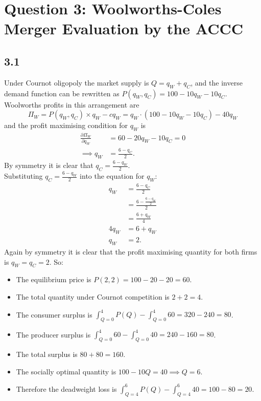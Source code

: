 \documentclass{article}
\begin{document}
\section*{Question 3: Woolworths-Coles Merger Evaluation by the ACCC}
\subsection*{3.1}
Under Cournot oligopoly the market supply is $Q = q_{W} + q_{C}$, and the inverse demand function can be rewritten as $P(q_{W}, q_{C}) = 100 - 10q_{W} - 10q_{C}$. Woolworths profits in this arrangement are 
$$\Pi_{W} = P(q_{W}, q_{C}) \times q_{W} - c q_{W} = q_{W} \cdot (100 - 10q_{W} - 10q_{C}) - 40 q_{W}$$
and the profit maximising condition for $q_{W}$ is
\begin{align*}
    \frac{\partial \Pi_{W}}{\partial q_{W}} &= 60 - 20 q_{W} - 10 q_{C} = 0\\
    \implies q_{W} &= \frac{6 - q_{C}}{2}.
\end{align*}
By symmetry it is clear that $q_{C} = \frac{6 - q_{W}}{2}$.\\[2mm]
Substituting $q_{C} = \frac{6 - q_{W}}{2}$ into the equation for $q_{W}$:
\begin{align*}
    q_{W} &= \frac{6 - q_{C}}{2}\\
    &= \frac{6 - \frac{6 - q_{W}}{2}}{2}\\
    &= \frac{6 + q_{W}}{4}\\
    4 q_{W} &= 6 + q_{W}\\
    q_{W} &= 2.
\end{align*}
Again by symmetry it is clear that the profit maximising quantity for both firms is $q_{W} = q_{C} = 2$. So:
\begin{itemize}
    \item The equilibrium price is $P(2, 2) = 100 - 20 - 20 = 60$.
    \item The total quantity under Cournot competition is $2 + 2 = 4$.
    \item The consumer surplus is $\int_{Q=0}^{4} P(Q) - \int_{Q=0}^{4} 60 = 320 - 240 = 80$.
    \item The producer surplus is $\int_{Q=0}^{4} 60 - \int_{Q=0}^{4} 40 = 240 - 160 = 80$.
    \item The total surplus is $80 + 80 = 160$.
    \item The socially optimal quantity is $100-10Q = 40 \implies Q = 6$.
    \item Therefore the deadweight loss is $\int_{Q=4}^{6} P(Q) - \int_{Q=4}^{6} 40 = 100 - 80 = 20$.
\end{itemize}
\end{document}
